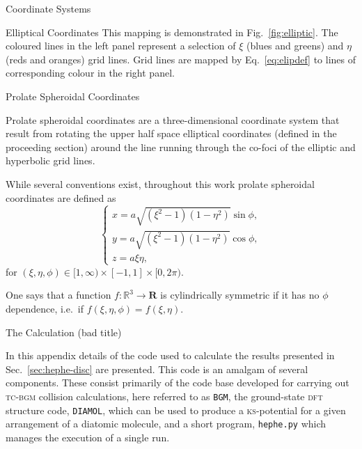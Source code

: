 \documentclass[letterpaper, 11 pt]{report}
\begin{document}
\begin{appendices}
\begin{chapter}{Coordinate Systems \label{chap:coords}}
\begin{section}{Elliptical Coordinates \label{sec:elliptic}}
         This mapping is demonstrated in Fig.~\ref{fig:elliptic}. The coloured lines in the left panel
         represent a selection of $\xi$ (blues and greens) and $\eta$ (reds and oranges) grid lines.
         Grid lines are mapped by Eq.~\eqref{eq:elipdef} to lines of corresponding colour in the right
         panel.

      \end{section}

      \begin{section}{Prolate Spheroidal Coordinates \label{sec:prolate}}

         Prolate spheroidal coordinates are a three-dimensional coordinate system that result from
         rotating the upper half space elliptical coordinates (defined in the proceeding section) around
         the line running through the co-foci of the elliptic and hyperbolic grid lines.

         While several conventions exist, throughout this work prolate spheroidal coordinates are
         defined as
         \begin{equation} \label{eq:psc}
            \left\{
            \begin{array}{l}
               x = a \sqrt{(\xi^2 - 1)(1 - \eta^2)} \sin \phi, \\
               y = a \sqrt{(\xi^2 - 1)(1 - \eta^2)} \cos \phi, \\
               z = a \xi \eta,
            \end{array}
            \right.
         \end{equation}
         for $(\xi, \eta, \phi) \in [1, \infty) \times [-1,1] \times [0,2\pi)$.

         One says that a function $f: \mathbb{R}^3 \rightarrow \mathbf{R}$ is cylindrically symmetric if
         it has no $\phi$ dependence, i.e.\ if $f(\xi,\eta,\phi) = f(\xi,\eta)$.

      \end{section}

   \end{chapter}

   \begin{chapter}{The Calculation (bad title) \label{chap:calcdeets}}

      In this appendix details of the code used to calculate the results presented in
      Sec.~\ref{sec:hephe-disc} are presented. This code is an amalgam of several components. These
      consist primarily of the code base developed for carrying out \textsc{tc-bgm} collision
      calculations, here referred to as \texttt{BGM}, the ground-state \textsc{dft} structure code,
      \texttt{DIAMOL}, which can be used to produce a \textsc{ks}-potential for a given arrangement of a
      diatomic molecule, and a short program, \texttt{hephe.py} which manages the execution of a single
      run.


\end{chapter}
\end{appendices}
\end{document}
